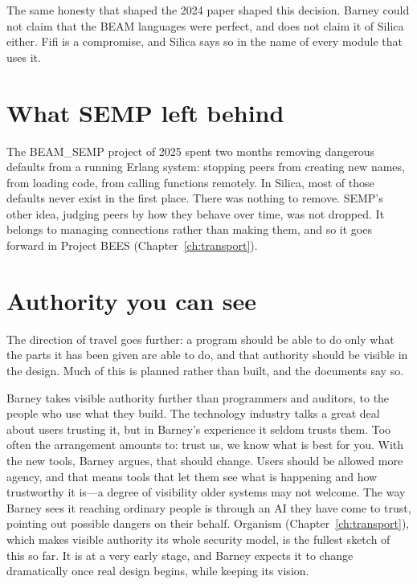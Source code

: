 The same honesty that shaped the 2024 paper shaped this decision. Barney could
not claim that the BEAM languages were perfect, and does not claim it of Silica
either. Fifi is a compromise, and Silica says so in the name of every module that
uses it.

\section{What SEMP left behind}

The BEAM\_SEMP project of 2025 spent two months removing dangerous defaults
from a running Erlang system: stopping peers from creating new names, from
loading code, from calling functions remotely. In Silica, most of those
defaults never exist in the first place. There was nothing to remove. SEMP's
other idea, judging peers by how they behave over time, was not dropped. It
belongs to managing connections rather than making them, and so it goes forward
in Project BEES (Chapter~\ref{ch:transport}).

\section{Authority you can see}

The direction of travel goes further: a program should be able to do only what
the parts it has been given are able to do, and that authority should be
visible in the design. Much of this is planned rather than built, and the
documents say so.

Barney takes visible authority further than programmers and auditors, to the
people who use what they build. The technology industry talks a great deal about
users trusting it, but in Barney's experience it seldom trusts them. Too often
the arrangement amounts to: trust us, we know what is best for you. With the new
tools, Barney argues, that should change. Users should be allowed more agency,
and that means tools that let them see what is happening and how trustworthy it
is---a degree of visibility older systems may not welcome. The way Barney sees it
reaching ordinary people is through an AI they have come to trust, pointing out
possible dangers on their behalf. Organism (Chapter~\ref{ch:transport}), which
makes visible authority its whole security model, is the fullest sketch of this
so far. It is at a very early stage, and Barney expects it to change
dramatically once real design begins, while keeping its vision.


